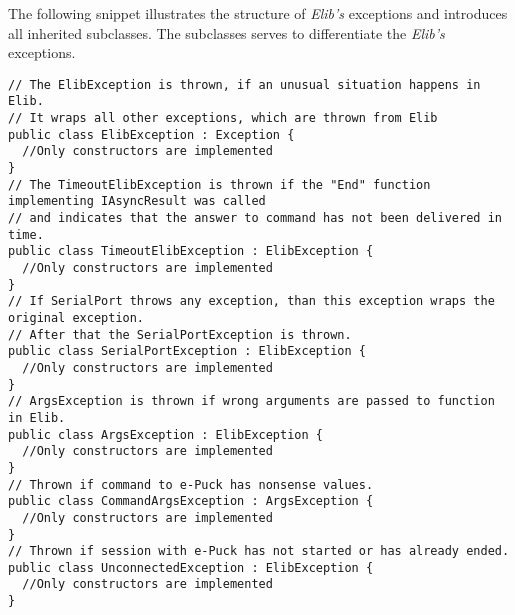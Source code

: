   The following snippet illustrates the structure of {\it Elib's} exceptions and
  introduces all inherited subclasses.
  The subclasses serves to differentiate the {\it Elib's} exceptions.
\begin{lstlisting}
// The ElibException is thrown, if an unusual situation happens in Elib.
// It wraps all other exceptions, which are thrown from Elib
public class ElibException : Exception { 
  //Only constructors are implemented
}
// The TimeoutElibException is thrown if the "End" function implementing IAsyncResult was called 
// and indicates that the answer to command has not been delivered in time.
public class TimeoutElibException : ElibException { 
  //Only constructors are implemented
}
// If SerialPort throws any exception, than this exception wraps the original exception.
// After that the SerialPortException is thrown.
public class SerialPortException : ElibException {
  //Only constructors are implemented
}
// ArgsException is thrown if wrong arguments are passed to function in Elib.
public class ArgsException : ElibException {
  //Only constructors are implemented
}
// Thrown if command to e-Puck has nonsense values.
public class CommandArgsException : ArgsException {
  //Only constructors are implemented
}
// Thrown if session with e-Puck has not started or has already ended.
public class UnconnectedException : ElibException {
  //Only constructors are implemented
}

\end{lstlisting}
